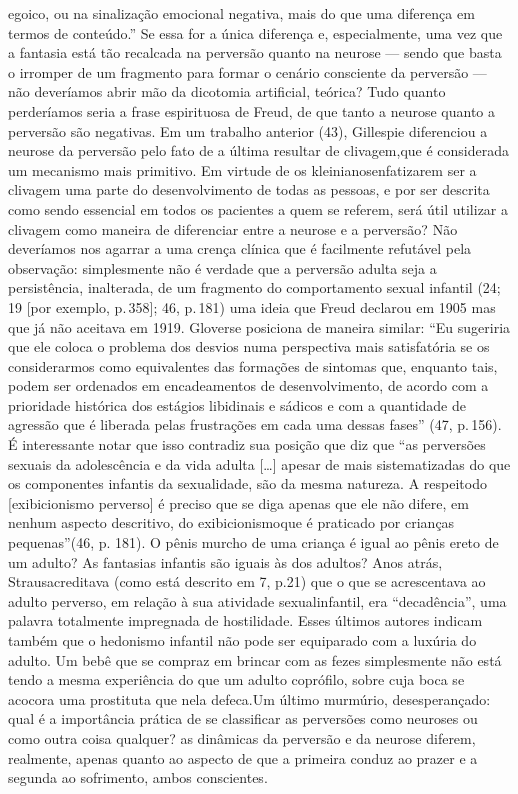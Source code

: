 \begin{enumerate}
{egoico, ou na sinalização emocional negativa, mais do que uma diferença
em termos de conteúdo.'' Se essa for a única diferença e,
especialmente, uma vez que a fantasia está tão recalcada na perversão
quanto na neurose --- sendo que basta o irromper de um fragmento para
formar o cenário consciente da perversão --- não deveríamos abrir mão
da dicotomia artificial, teórica? Tudo quanto perderíamos seria a frase
espirituosa de Freud, de que tanto a neurose quanto a perversão são
negativas. Em um trabalho anterior (43), Gillespie diferenciou a
neurose da perversão pelo fato de a última resultar de clivagem,\idxcliv[|nn] que é
considerada um mecanismo mais primitivo. Em virtude de os kleinianos\idxklein[|nn]
enfatizarem ser a clivagem uma parte do desenvolvimento de todas as
pessoas, e por ser descrita como sendo essencial em todos os pacientes
a quem se referem, será útil utilizar a clivagem como maneira de
diferenciar entre a neurose e a perversão? Não deveríamos nos
agarrar a uma crença clínica que é facilmente refutável pela
observação: simplesmente não é verdade que a perversão adulta seja a
persistência, inalterada, de um fragmento do comportamento sexual
infantil (24; 19 [por exemplo, p.\,358]; 46, p.\,181) uma ideia que Freud
declarou em 1905 mas que já não aceitava em 1919. Glover\idxglove[|nn] se posiciona
de maneira similar: ``Eu sugeriria que ele coloca o
problema dos desvios numa perspectiva mais satisfatória se os
considerarmos como equivalentes das formações de sintomas que, enquanto
tais, podem ser ordenados em encadeamentos de desenvolvimento, de
acordo com a prioridade histórica dos estágios libidinais e sádicos e
com a quantidade de agressão que é liberada pelas frustrações em cada
uma dessas fases'' (47, p.\,156). É interessante notar que
isso contradiz sua posição que diz que ``as perversões
sexuais da adolescência e da vida adulta [\ldots{}] apesar de mais sistematizadas 
do que os componentes infantis da sexualidade, são da mesma natureza. A 
respeito\idxinfanexib[|nn] do [exibicionismo perverso] é preciso que se diga apenas 
que ele não difere, em nenhum aspecto descritivo, do exibicionismo\idxexibi[|nn] que 
é praticado por crianças pequenas''\idxexibiinfa[|nn] (46,
p. 181). O pênis murcho de uma criança é igual ao pênis ereto de um adulto? As 
fantasias infantis são iguais às dos adultos? Anos atrás, Straus\idxstraus[|nn] 
acreditava (como está descrito em 7, p.21) que o que se
acrescentava ao adulto perverso, em relação à sua atividade 
sexual\idxinfansexua[|nn] infantil, era ``decadência'', uma palavra totalmente 
impregnada de hostilidade. Esses últimos autores indicam
também que o hedonismo infantil não pode ser equiparado com a luxúria do adulto. 
Um bebê que se compraz em brincar com as fezes simplesmente não está tendo a mesma 
experiência do que um adulto coprófilo, sobre
cuja boca se acocora uma prostituta que nela defeca.\idxcopro[|nn] Um último 
murmúrio, desesperançado: qual é a importância prática de se classificar as 
perversões como neuroses ou como outra coisa qualquer?} as dinâmicas da 
perversão e da neurose diferem, realmente, apenas
quanto ao aspecto de que a primeira conduz ao prazer e a segunda ao sofrimento, 
ambos conscientes.


\end{enumerate}
